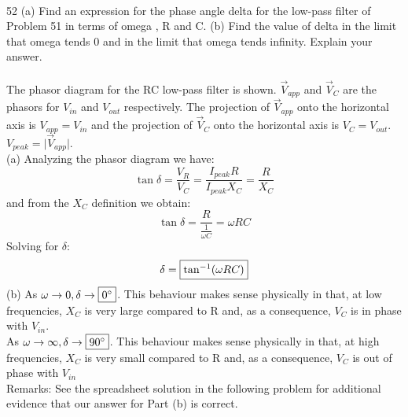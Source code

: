 \documentclass{report}
\begin{document}
\paragraph{} 
52 (a) Find an expression for the phase angle delta for the low-pass filter of Problem 51 in terms of omega , R and C. (b) Find the value of delta in the limit that omega tends 0 and in the limit that omega tends infinity. Explain your answer.\\
\\
The phasor diagram for the RC low-pass filter is shown. $\vec V_{app}$ and $\vec V_C$ are the phasors for $V_{in}$ and $V_{out}$ respectively. The projection of $\vec V_{app}$ onto the horizontal axis is $V_{app} = V_{in}$ and the projection of $\vec V_C$ onto the horizontal axis is $V_C = V_{out}$. $V_{peak} = \lvert \vec V_{app} \rvert$.\\
(a) Analyzing the phasor diagram we have:
$$\tan \delta = \frac{V_R}{V_C} = \frac{I_{peak}R}{I_{peak}X_C} = \frac{R}{X_C}$$
and from the $X_C$ definition we obtain:
$$\tan \delta = \frac{R}{\frac{1}{\omega C}} = \omega RC$$
Solving for $\delta$:
$$\delta = \fbox{$\tan^{-1}(\omega RC)$}$$
(b) As $\omega \rightarrow 0, \delta \rightarrow \fbox{$0^{\circ}$}$. This behaviour makes sense physically in that, at low frequencies, $X_C$ is very large compared to R and, as a consequence, $V_C$ is in phase with $V_{in}$.\\
As $\omega \rightarrow \infty, \delta \rightarrow \fbox{$90^{\circ}$}$. This behaviour makes sense physically in that, at high frequencies, $X_C$ is very small compared to R and, as a consequence, $V_C$ is out of phase with $V_{in}$\\
Remarks: See the spreadsheet solution in the following problem for additional evidence that our answer for Part (b) is correct.

\paragraph{}
\end{document}
